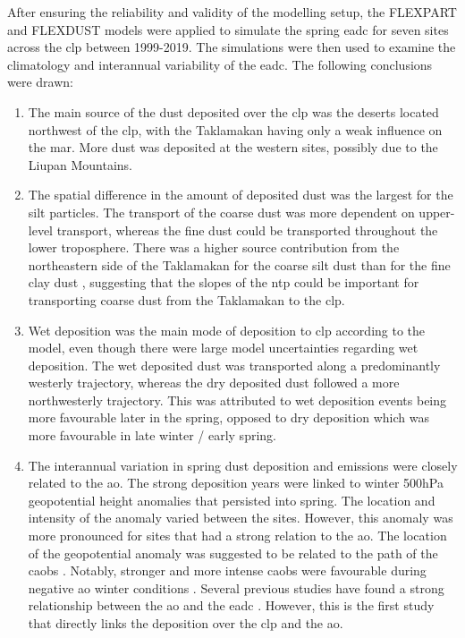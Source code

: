 After ensuring the reliability and validity of the modelling setup, the FLEXPART and FLEXDUST models were applied to simulate the spring \acrshort{eadc} for seven sites across the \acrshort{clp} between 1999-2019.
The simulations were then used to examine the climatology and interannual variability of the \acrshort{eadc}. The following conclusions were drawn:
\begin{enumerate}
    \item The main source of the dust deposited over the \acrshort{clp} was the deserts located northwest of the \acrshort{clp}, with the Taklamakan having only a weak influence on the \acrshort{mar}. More dust was deposited at the western sites, possibly due to the Liupan Mountains. 
    
    \item The spatial difference in the amount of deposited dust was the largest for the silt particles.
    The transport of the coarse dust was more dependent on upper-level transport, whereas the fine dust could be transported throughout the lower troposphere.
    There was a higher source contribution from the northeastern side of the Taklamakan for the coarse silt dust than for the fine clay dust , suggesting that the slopes of the \acrshort{ntp} could be important for transporting coarse dust from the Taklamakan to the \acrshort{clp}. 
    
    \item Wet deposition was the main mode of deposition to \acrshort{clp} according to the model, even though there were large model uncertainties regarding wet deposition. 
    The wet deposited dust was transported along a predominantly westerly trajectory, whereas the dry deposited dust followed a more northwesterly trajectory. 
    This was attributed to wet deposition events being more favourable later in the spring, opposed to dry deposition which was more favourable in late winter / early spring.

    \item The interannual variation in spring dust deposition and emissions were closely related to the \acrshort{ao}. The strong deposition years were linked to winter 500hPa geopotential height anomalies that persisted into spring. The location and intensity of the anomaly varied between the sites. However, this anomaly was more pronounced for sites that had a strong relation to the \acrshort{ao}. The location of the geopotential anomaly was suggested to be related to the path of the \acrshort{caob}s \parencite{yang2020interdecadal}. Notably, stronger and more intense \acrshort{caob}s were favourable during negative \acrshort{ao} winter conditions \parencite{yang2020interdecadal}.
    Several previous studies have found a strong relationship between the \acrshort{ao} and the \acrshort{eadc} \parencite{gong2006simulated,liu2018influence,mao2011influence}. However, this is the first study that directly links the deposition over the \acrshort{clp} and the \acrshort{ao}. 
    

\end{enumerate}
